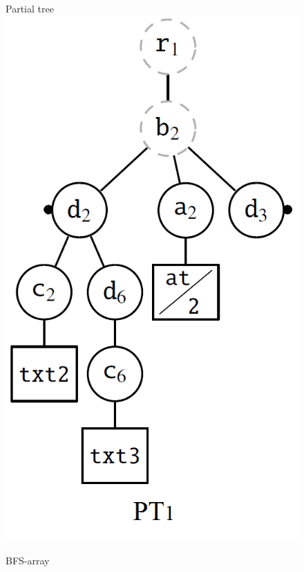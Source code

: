 \begin{figure}[t]
	\centering
	\begin{minipage}{.2\linewidth}
		Partial tree\\[15pt]
		\includegraphics[scale=.25]{partialtree/figures/bfspt1.png}
	\end{minipage}
	\begin{minipage}{.55\linewidth}
		BFS-array \\
		\begin{tabular}{c|lcrrrr}

\end{tabular}
\end{minipage}
\end{figure}

